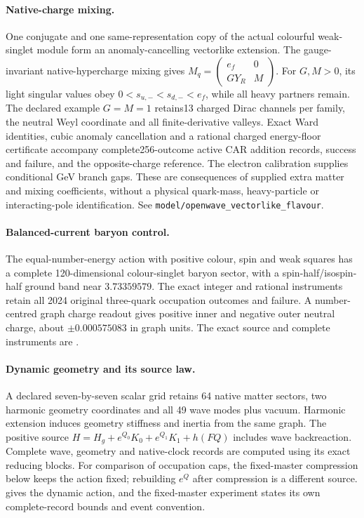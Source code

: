 \paragraph{Native-charge mixing.}
One conjugate and one same-representation copy of the actual colourful
weak-singlet module form an anomaly-cancelling vectorlike extension.
The gauge-invariant native-hypercharge mixing gives
$M_q=\left(\begin{smallmatrix}e_f&0\\GY_R&M\end{smallmatrix}\right)$.
For $G,M>0$, its light singular values obey
$0<s_{u,-}<s_{d,-}<e_f$, while all heavy partners remain.
The declared example $G=M=1$ retains13 charged Dirac channels per family,
the neutral Weyl coordinate and all finite-derivative valleys.
Exact Ward identities, cubic anomaly cancellation and a rational charged
energy-floor certificate accompany complete256-outcome active CAR addition
records, success and failure, and the opposite-charge reference.
The electron calibration supplies conditional GeV branch gaps.
These are consequences of supplied extra matter and mixing coefficients,
without a physical quark-mass, heavy-particle or interacting-pole
identification.
See \texttt{model/openwave\_vectorlike\_flavour}.



\paragraph{Balanced-current baryon control.}
The equal-number-energy action with positive colour, spin and weak
squares has a complete 120-dimensional colour-singlet baryon sector,
with a spin-half/isospin-half ground band near $3.73359579$.
The exact integer and rational instruments retain all 2024 original
three-quark occupation outcomes and failure. A number-centred graph
charge readout gives positive inner and negative outer neutral charge,
about $\pm0.000575083$ in graph units. The exact source and
complete instruments are .


\paragraph{Dynamic geometry and its source law.}
A declared seven-by-seven scalar grid retains 64 native matter sectors,
two harmonic geometry coordinates and all 49 wave modes plus vacuum.
Harmonic extension induces geometry stiffness and inertia from the same
graph. The positive source
$H=H_g+e^{Q_0}K_0+e^{Q_1}K_1+h(FQ)$ includes wave backreaction.
Complete wave, geometry and native-clock records are computed using its
exact reducing blocks. For comparison of occupation caps, the fixed-master
compression below keeps the action fixed; rebuilding $e^Q$ after
compression is a different source. 
gives the dynamic action, and the fixed-master experiment states its
own complete-record bounds and event convention.

